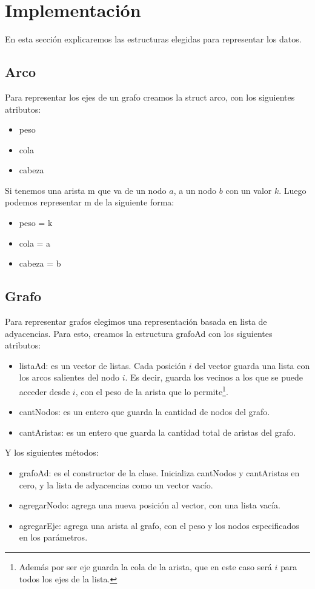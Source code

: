 \section{Implementaci\'on}
En esta sección explicaremos las estructuras elegidas para representar los datos.

\subsection{Arco}
Para representar los ejes de un grafo creamos la struct arco, con los siguientes atributos:
\begin{itemize}
\item peso
\item cola
\item cabeza
\end{itemize}
Si tenemos una arista m que va de un nodo $a$, a un nodo $b$ con un valor $k$. Luego podemos representar m de la siguiente forma:
\begin{itemize}
\item peso = k
\item cola = a
\item cabeza = b
\end{itemize}

\subsection{Grafo}
Para representar grafos elegimos una representación basada en lista de adyacencias. Para esto, creamos la estructura grafoAd con los siguientes atributos:
\begin{itemize}
\item listaAd: es un vector de listas. Cada posición $i$ del vector guarda una lista con los arcos salientes del nodo $i$. Es decir, guarda los vecinos a los que se puede acceder desde $i$, con el peso de la arista que lo permite\footnote{Además por ser eje guarda la cola de la arista, que en este caso será $i$ para todos los ejes de la lista.}.
\item cantNodos: es un entero que guarda la cantidad de nodos del grafo.
\item cantAristas: es un entero que guarda la cantidad total de aristas del grafo.
\end{itemize}

\indent Y los siguientes métodos:
\begin{itemize}
\item grafoAd: es el constructor de la clase. Inicializa cantNodos y cantAristas en cero, y la lista de adyacencias como un vector vacío.
\item agregarNodo: agrega una nueva posición al vector, con una lista vacía.
\item agregarEje: agrega una arista al grafo, con el peso y los nodos especificados en los parámetros.
\end{itemize}

